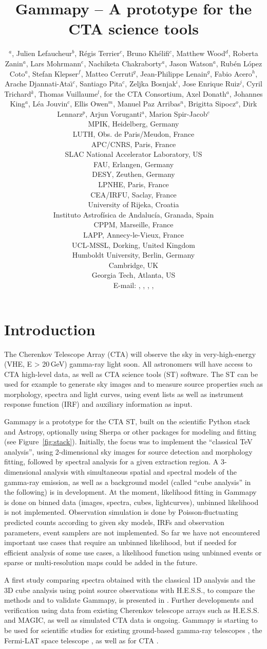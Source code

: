 \documentclass{PoS}
\title{Gammapy -- A prototype for the CTA science tools}
\author{
\speaker{Christoph Deil}$^a$,
Julien Lefaucheur$^b$,
R\'egis Terrier$^c$,
Bruno Kh\'elifi$^c$,
Matthew Wood$^d$,
Roberta Zanin$^a$,
Lars Mohrmann$^e$,
Nachiketa Chakraborty$^a$,
Jason Watson$^a$,
Rub\'en L\'opez Coto$^a$,
Stefan Klepser$^f$,
Matteo Cerruti$^g$,
Jean-Philippe Lenain$^g$,
Fabio Acero$^h$,
Arache Djannati-Ata{\"\i}$^c$,
Santiago Pita$^c$,
Zeljka Bosnjak$^i$,
Jose Enrique Ruiz$^j$,
Cyril Trichard$^k$,
Thomas Vuillaume$^l$,
for the CTA Consortium,
Axel Donath$^a$,
Johannes King$^a$,
L\'ea Jouvin$^c$,
Ellis Owen$^m$,
Manuel Paz Arribas$^n$,
Brigitta Sipocz$^o$,
Dirk Lennarz$^p$,
Arjun Voruganti$^a$,
Marion Spir-Jacob$^c$
\\
\llap{$^a$}MPIK, Heidelberg, Germany\\
\llap{$^b$}LUTH, Obs. de Paris/Meudon, France\\
\llap{$^c$}APC/CNRS, Paris, France\\
\llap{$^d$}SLAC National Accelerator Laboratory, US\\
\llap{$^e$}FAU, Erlangen, Germany\\
\llap{$^f$}DESY, Zeuthen, Germany\\
\llap{$^g$}LPNHE, Paris, France\\
\llap{$^h$}CEA/IRFU, Saclay, France\\
\llap{$^i$}University of Rijeka, Croatia\\
\llap{$^j$}Instituto Astrof\'isica de Andaluc\'ia, Granada, Spain\\
\llap{$^k$}CPPM, Marseille, France\\
\llap{$^l$}LAPP, Annecy-le-Vieux, France\\
\llap{$^m$}UCL-MSSL, Dorking, United Kingdom\\
\llap{$^n$}Humboldt University, Berlin, Germany\\
\llap{$^o$}Cambridge, UK\\
\llap{$^p$}Georgia Tech, Atlanta, US\\
E-mail:
\email{Christoph.Deil@mpi-hd.mpg.de},
\email{julien.lefaucheur@obspm.fr},
\email{Roberta.Zanin@mpi-hd.mpg.de},
\email{khelifi@apc.in2p3.fr},
}
\begin{document}
\section{Introduction}
\label{sec:intro}

The Cherenkov Telescope Array (CTA) will observe the sky in very-high-energy (VHE, E > 20$\,$GeV)
gamma-ray light soon. All astronomers will have access to CTA high-level data,
as well as CTA science tools (ST) software. The ST can be used for example to
generate sky images and to measure source properties such as morphology, spectra
and light curves, using event lists as well as instrument response function
(IRF) and auxiliary information as input.

Gammapy is a prototype for the CTA ST, built on the scientific Python stack and
Astropy, optionally using Sherpa or other packages for modeling and fitting (see
Figure~\ref{fig:stack}). Initially, the focus was to implement the ``classical
TeV analysis'', using 2-dimensional sky images for source detection and morphology
fitting, followed by spectral analysis for a given extraction region. A
3\hbox{-}dimensional analysis with simultaneous spatial and spectral models of the
gamma-ray emission, as well as a background model (called ``cube analysis'' in the
following) is in development. At the moment, likelihood fitting in Gammapy is
done on binned data (images, spectra, cubes, lightcurves), unbinned likelihood
is not implemented. Observation simulation is done by Poisson-fluctuating
predicted counts according to given sky models, IRFs and observation parameters,
event samplers are not implemented. So far we have not encountered important use
cases that require an unbinned likelihood, but if needed for efficient analysis
of some use cases, a likelihood function using unbinned events or sparse or
multi-resolution maps could be added in the future.

A first study comparing spectra obtained with the classical 1D analysis and the
3D cube analysis using point source observations with H.E.S.S., to compare the
methods and to validate Gammapy, is presented in \cite{lea}. Further
developments and verification using data from existing Cherenkov telescope
arrays such as H.E.S.S. and MAGIC, as well as simulated CTA data is ongoing.
Gammapy is starting to be used for scientific studies for existing ground-based
gamma-ray telescopes \cite{hgps, shells}, the Fermi-LAT space telescope
\cite{owen2015}, as well as for CTA \cite{julien, roberta, cyril}.
\end{document}
